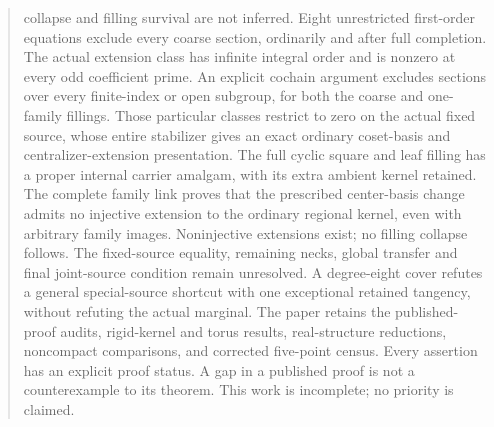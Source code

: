 \documentclass[11pt,a4paper]{article}
\begin{document}
\begin{abstract}
collapse and filling survival are not inferred. Eight unrestricted first-order
equations exclude every coarse section, ordinarily and after full
completion. The actual extension class has infinite integral order and
is nonzero at every odd coefficient prime. An explicit cochain argument
excludes sections over every finite-index or open subgroup, for both
the coarse and one-family fillings. Those particular classes restrict
to zero on the actual fixed source, whose entire stabilizer gives an
exact ordinary coset-basis and centralizer-extension presentation.
The full cyclic square and leaf filling has a proper internal carrier
amalgam, with its extra ambient kernel retained. The complete family
link proves that the prescribed center-basis change admits no injective
extension to the ordinary regional kernel, even with arbitrary family
images. Noninjective extensions exist; no filling collapse follows.
The fixed-source equality, remaining necks, global transfer and final
joint-source condition remain unresolved. A degree-eight cover refutes
a general special-source shortcut with one exceptional retained
tangency, without refuting the actual marginal. The paper retains the published-proof audits, rigid-kernel
and torus results, real-structure reductions, noncompact comparisons,
and corrected five-point census. Every assertion has an explicit proof
status. A gap in a published proof is not a counterexample to its theorem.
This work is incomplete; no priority is claimed.
\end{abstract}
\tableofcontents
\clearpage
\end{document}
